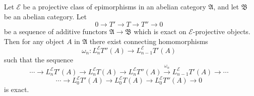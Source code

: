 Let $\mathcal{E}$ be a projective class of epimorphisms in an abelian category $\mathfrak{A}$, and let $\mathfrak{B}$ be an abelian category. Let
\[
0 \to T' \to T \to T'' \to 0
\]
be a sequence of additive functors $\mathfrak{A} \to \mathfrak{B}$ which is exact on $\mathcal{E}$-projective objects. Then for any object $A$ in $\mathfrak{A}$ there exist connecting homomorphisms
\[
\omega_n : L_n^{\mathcal{E}} T''(A) \to L_{n-1}^{\mathcal{E}} T'(A)
\]
such that the sequence
\[
\cdots \to L_n^{\mathcal{E}} T'(A) \to L_n^{\mathcal{E}} T(A) \to L_n^{\mathcal{E}} T''(A) \xrightarrow{\omega_n} L_{n-1}^{\mathcal{E}} T'(A) \to \cdots
\]
\[
\cdots \to L_0^{\mathcal{E}} T'(A) \to L_0^{\mathcal{E}} T(A) \to L_0^{\mathcal{E}} T''(A) \to 0
\]
is exact.
